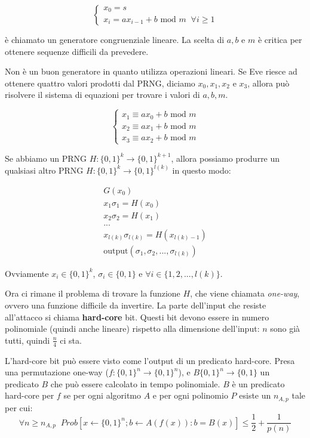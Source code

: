 \[
\begin{cases}
x_0 = s \\ 
x_i = ax_{i-1} + b \text { mod } m \; \; \forall i \geq 1
\end{cases}
\]

è chiamato un generatore congruenziale lineare.
La scelta di $a, b$ e $m$ è critica per ottenere sequenze difficili da prevedere.

Non è un buon generatore in quanto utilizza operazioni lineari. Se Eve riesce ad ottenere quattro valori prodotti dal PRNG, diciamo $x_0, x_1, x_2$ e $x_3$, allora può risolvere il sistema di equazioni per trovare i valori di $a, b, m$.

\[
\begin{cases}
x_1 \equiv ax_0 + b \text{ mod } m\\
x_2 \equiv ax_1 + b \text{ mod } m\\
x_3 \equiv ax_2 + b \text{ mod } m
\end{cases}
\]

Se abbiamo un PRNG $H: \{0,1\}^k \rightarrow \{0,1\}^{k+1}$, allora possiamo produrre un qualsiasi altro PRNG $H:\{0,1\}^k \rightarrow \{0,1\}^{l(k)}$ in questo modo:

\begin{align*}
G(x_0)\\
x_1\sigma_1 = H(x_0)\\
x_2\sigma_2 = H(x_1)\\
...\\
x_{l(k)}\sigma_{l(k)} = H(x_{l(k)-1})\\
\text{output} (\sigma_1, \sigma_2, ..., \sigma_{l(k)})
\end{align*}

Ovviamente $x_i \in \{0,1\}^k$, $\sigma_i \in \{0,1\}$ e $\forall i \in \{1, 2, ..., l(k)\}$.

Ora ci rimane il problema di trovare la funzione $H$, che viene chiamata \textit{one-way}, ovvero una funzione difficile da invertire. La parte dell'input che resiste all'attacco si chiama \textbf{hard-core} bit. Questi bit devono essere in numero polinomiale (quindi anche lineare) rispetto alla dimensione dell'input: $n$ sono già tutti, quindi $\frac{n}{4}$ ci sta.


L'hard-core bit può essere visto come l'output di un predicato hard-core. Presa una permutazione one-way ($f: \{0,1\}^n \rightarrow \{0,1\}^n$), e $B\{0,1\}^n \rightarrow \{0,1\}$ un predicato $B$ che può essere calcolato in tempo polinomiale. $B$ è un predicato hard-core per $f$ se per ogni algoritmo $A$ e per ogni polinomio $P$ esiste un $n_{A,p}$ tale per cui:
\begin{equation*}
\forall n \geq n_{A,p} \;\; Prob[x \leftarrow \{0,1\}^n;  b \leftarrow A(f(x)) : b = B(x)] \leq \frac12 + \frac1{p(n)}
\end{equation*}

